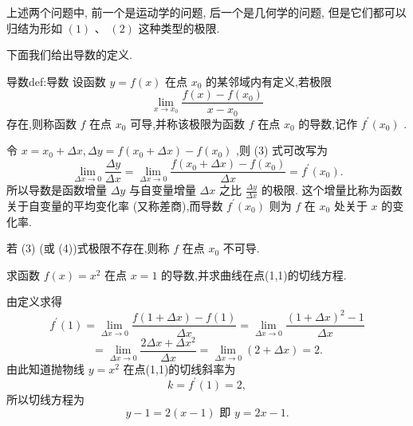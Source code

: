上述两个问题中, 前一个是运动学的问题, 后一个是几何学的问题, 但是它们都可以归结为形如 \(\left( 1\right) \text{ 、 }\left( 2\right)\) 这种类型的极限.

下面我们给出导数的定义.

\begin{definition}{导数}{def:导数}
设函数 \(y = f\left( x\right)\) 在点 \({x}_{0}\) 的某邻域内有定义,若极限
\[
\mathop{\lim }\limits_{{x \rightarrow  {x}_{0}}}\frac{f\left( x\right)  - f\left( {x}_{0}\right) }{x - {x}_{0}} \tag{3}
\]
存在,则称函数 \(f\) 在点 \({x}_{0}\) 可导,并称该极限为函数 \(f\) 在点 \({x}_{0}\) 的导数,记作 \({f}^{\prime }\left( {x}_{0}\right)\) .
\end{definition}


令 \(x = {x}_{0} + {\Delta x},{\Delta y} = f\left( {{x}_{0} + {\Delta x}}\right)  - f\left( {x}_{0}\right)\) ,则 (3) 式可改写为
\[
\mathop{\lim }\limits_{{{\Delta x} \rightarrow  0}}\frac{\Delta y}{\Delta x} = \mathop{\lim }\limits_{{{\Delta x} \rightarrow  0}}\frac{f\left( {{x}_{0} + {\Delta x}}\right)  - f\left( {x}_{0}\right) }{\Delta x} = {f}^{\prime }\left( {x}_{0}\right) . \tag{4}
\]
所以导数是函数增量 \({\Delta y}\) 与自变量增量 \({\Delta x}\) 之比 \(\frac{\Delta y}{\Delta x}\) 的极限. 这个增量比称为函数关于自变量的平均变化率 (又称差商),而导数 \({f}^{\prime }\left( {x}_{0}\right)\) 则为 \(f\) 在 \({x}_{0}\) 处关于 \(x\) 的变化率.

若 (3) (或 (4))式极限不存在,则称 \(f\) 在点 \({x}_{0}\) 不可导.

\begin{example}
求函数 \(f\left( x\right)  = {x}^{2}\) 在点 \(x = 1\) 的导数,并求曲线在点(1,1)的切线方程.
\end{example}


\begin{solution}
由定义求得
\[
{f}^{\prime }\left( 1\right)  = \mathop{\lim }\limits_{{{\Delta x} \rightarrow  0}}\frac{f\left( {1 + {\Delta x}}\right)  - f\left( 1\right) }{\Delta x} = \mathop{\lim }\limits_{{{\Delta x} \rightarrow  0}}\frac{{\left( 1 + \Delta x\right) }^{2} - 1}{\Delta x}
\]
\[
= \mathop{\lim }\limits_{{{\Delta x} \rightarrow  0}}\frac{{2\Delta x} + \Delta {x}^{2}}{\Delta x} = \mathop{\lim }\limits_{{{\Delta x} \rightarrow  0}}\left( {2 + {\Delta x}}\right)  = 2.
\]
由此知道抛物线 \(y = {x}^{2}\) 在点(1,1)的切线斜率为
\[
k = {f}^{\prime }\left( 1\right)  = 2,
\]
所以切线方程为
\[
y - 1 = 2\left( {x - 1}\right) \text{ 即 }y = {2x} - 1.
\]
\end{solution}

